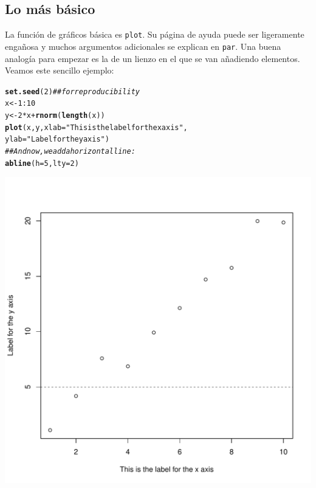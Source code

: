 \documentclass{config/apuntes}\usepackage[]{graphicx}\usepackage[]{xcolor}
\makeatletter
\def\maxwidth{ %
  \ifdim\Gin@nat@width>\linewidth
    \linewidth
  \else
    \Gin@nat@width
  \fi
}
\newcommand{\hlnum}[1]{\textcolor[rgb]{0.686,0.059,0.569}{#1}}%
\newcommand{\hlsng}[1]{\textcolor[rgb]{0.192,0.494,0.8}{#1}}%
\newcommand{\hlcom}[1]{\textcolor[rgb]{0.678,0.584,0.686}{\textit{#1}}}%
\newcommand{\hlopt}[1]{\textcolor[rgb]{0,0,0}{#1}}%
\newcommand{\hldef}[1]{\textcolor[rgb]{0.345,0.345,0.345}{#1}}%
\newcommand{\hlkwb}[1]{\textcolor[rgb]{0.69,0.353,0.396}{#1}}%
\newcommand{\hlkwc}[1]{\textcolor[rgb]{0.333,0.667,0.333}{#1}}%
\newcommand{\hlkwd}[1]{\textcolor[rgb]{0.737,0.353,0.396}{\textbf{#1}}}%
\newenvironment{kframe}{%
 \def\at@end@of@kframe{}%
 \ifinner\ifhmode%
  \def\at@end@of@kframe{\end{minipage}}%
  \begin{minipage}{\columnwidth}%
 \fi\fi%
 \def\FrameCommand##1{\hskip\@totalleftmargin \hskip-\fboxsep
 \colorbox{shadecolor}{##1}\hskip-\fboxsep
     \hskip-\linewidth \hskip-\@totalleftmargin \hskip\columnwidth}%
 \MakeFramed {\advance\hsize-\width
   \@totalleftmargin\z@ \linewidth\hsize
   \@setminipage}}%
 {\par\unskip\endMakeFramed%
 \at@end@of@kframe}
\newenvironment{knitrout}{}{} %
\newcommand{\code}[1]{\texttt{#1}}
\makeatother
\begin{document}
\subsection{Lo más básico}
La función de gráficos básica es \code{plot}. Su página de ayuda puede ser ligeramente engañosa y muchos argumentos adicionales se explican en \code{par}. Una buena analogía para empezar es la de un lienzo en el que se van añadiendo elementos. Veamos este sencillo ejemplo:
\begin{knitrout}
\color{fgcolor}\begin{kframe}
\begin{alltt}
\hlkwd{set.seed}\hldef{(}\hlnum{2}\hldef{)} \hlcom{## for reproducibility}
\hldef{x} \hlkwb{<-} \hlnum{1}\hlopt{:}\hlnum{10}
\hldef{y} \hlkwb{<-} \hlnum{2} \hlopt{*} \hldef{x} \hlopt{+} \hlkwd{rnorm}\hldef{(}\hlkwd{length}\hldef{(x))}
\hlkwd{plot}\hldef{(x, y,} \hlkwc{xlab} \hldef{=} \hlsng{"This is the label for the x axis"}\hldef{,}
     \hlkwc{ylab} \hldef{=} \hlsng{"Label for the y axis"}\hldef{)}
\hlcom{## And now, we add a horizontal line:}
\hlkwd{abline}\hldef{(}\hlkwc{h} \hldef{=} \hlnum{5}\hldef{,} \hlkwc{lty} \hldef{=} \hlnum{2}\hldef{)}
\end{alltt}
\end{kframe}
\includegraphics[width=\maxwidth]{figure/unnamed-chunk-72-1} 
\end{knitrout}
\end{document}
